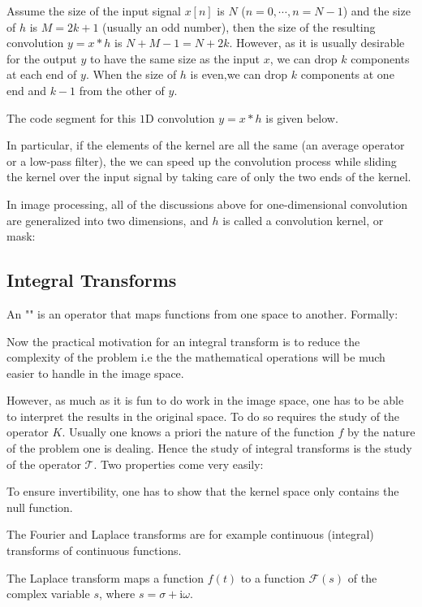 	
	Assume the size of the input signal $x[n]$ is $N$ ($n=0,\cdots,n=N-1$) and the size of $h$ is $M=2k+1$ (usually an odd number), then the size of the resulting convolution $y=x*h$ is $N+M-1=N+2k$. However, as it is usually desirable for the output $y$ to have the same size as the input $x$, we can drop $k$ components at each end of $y$. When the size of $h$ is even,we can drop $k$ components at one end and $k-1$ from the other of $y$.
	
	The code segment for this $1$D convolution $y=x*h$ is given below. 
	
	In particular, if the elements of the kernel are all the same (an average operator or a low-pass filter), the we can speed up the convolution process while sliding the kernel over the input signal by taking care of only the two ends of the kernel. 
	
	In image processing, all of the discussions above for one-dimensional	convolution are generalized into two dimensions, and $h$ is called a convolution kernel, or mask:
	

	\pagebreak
	\subsection{Integral Transforms}
	An "" is an operator that maps functions from one space to another. Formally:
	
	Now the practical motivation for an integral transform is to reduce the complexity of the problem i.e the the mathematical operations will be much easier to handle in the image space.
	
	However, as much as it is fun to do work in the image space, one has to be able to interpret the results in the original space. To do so requires the study of the operator $K$. Usually one knows a priori the nature of the function $f$ by the nature of the problem one is dealing. Hence the study of integral transforms is the study of the operator $\mathcal{T}$. Two properties come very easily:
	
	To ensure invertibility, one has to show that the kernel space only contains the null function.

	The Fourier and Laplace transforms are for example continuous (integral) transforms of continuous functions.

	The Laplace transform maps a function $f(t)$ to a function $\mathcal{F}(s)$ of the complex variable $s$, where $s=\sigma+\mathrm{i}\omega$.

